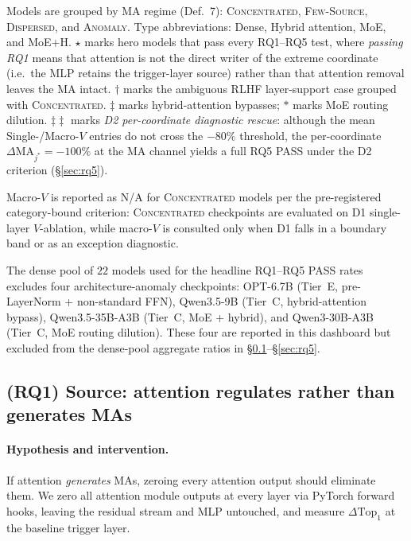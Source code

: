 \documentclass{article}
\newcommand{\topk}{\mathrm{Top}}
\begin{document}
\begin{table}[t]
  \smallskip
  \footnotesize
  \begin{flushleft}
    Models are grouped by MA regime (Def.~7): \textsc{Concentrated},
    \textsc{Few-Source}, \textsc{Dispersed}, and \textsc{Anomaly}.
    Type abbreviations: Dense, Hybrid attention, MoE, and MoE+H.
    $\star$ marks hero models that pass every RQ1--RQ5 test, where
    \emph{passing RQ1} means that attention is not the direct writer of
    the extreme coordinate (i.e.\ the MLP retains the trigger-layer source)
    rather than that attention removal leaves the MA intact.
    $\dagger$ marks the ambiguous RLHF layer-support case grouped with
    \textsc{Concentrated}. $\ddagger$ marks hybrid-attention bypasses;
    $\ast$ marks MoE routing dilution. $\ddagger\ddagger$ marks
    \emph{D2 per-coordinate diagnostic rescue}: although the mean
    Single-/Macro-$V$ entries do not cross the $-80\%$ threshold, the
    per-coordinate $\Delta\mathrm{MA}_{j^{*}} = -100\%$ at the MA channel
    yields a full RQ5 PASS under the D2 criterion (\S\ref{sec:rq5}).

    Macro-$V$ is reported as N/A for \textsc{Concentrated} models per
    the pre-registered category-bound criterion: \textsc{Concentrated}
    checkpoints are evaluated on D1 single-layer $V$-ablation, while
    macro-$V$ is consulted only when D1 falls in a boundary band or as
    an exception diagnostic.

    The dense pool of $22$ models used for the headline RQ1--RQ5 PASS
    rates excludes four architecture-anomaly checkpoints: OPT-6.7B
    (Tier~E, pre-LayerNorm + non-standard FFN), Qwen3.5-9B (Tier~C,
    hybrid-attention bypass), Qwen3.5-35B-A3B (Tier~C, MoE + hybrid),
    and Qwen3-30B-A3B (Tier~C, MoE routing dilution). These four are
    reported in this dashboard but excluded from the dense-pool
    aggregate ratios in \S\ref{sec:rq1}--\S\ref{sec:rq5}.
  \end{flushleft}
\end{table}

\subsection{(RQ1) Source: attention regulates rather than generates MAs}
\label{sec:rq1}

\paragraph{Hypothesis and intervention.}
If attention \emph{generates} MAs, zeroing every attention output should
eliminate them. We zero all attention module outputs at every layer via
PyTorch forward hooks, leaving the residual stream and MLP untouched, and
measure $\Delta\topk_1$ at the baseline trigger layer.
\end{document}
